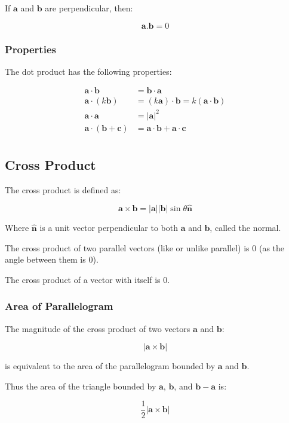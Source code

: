 \documentclass[a4paper,11pt]{article}
\newcommand{\bb}{\boldsymbol}
\begin{document}
If $\bb{a}$ and $\bb{b}$ are perpendicular, then:

$$
\bb{a} . \bb{b} = 0
$$


\subsubsection{Properties}

The dot product has the following properties:

$$
\begin{aligned}
	\bb{a} \cdot \bb{b} & = \bb{b} \cdot \bb{a} \\
	\bb{a} \cdot (k \bb{b}) & = (k \bb{a}) \cdot \bb{b} = k (\bb{a} \cdot \bb{b}) \\
	\bb{a} \cdot \bb{a} & = \lvert \bb{a} \rvert^2 \\
	\bb{a} \cdot (\bb{b} + \bb{c}) & = \bb{a} \cdot \bb{b} + \bb{a} \cdot \bb{c} \\
\end{aligned}
$$


\subsection{Cross Product}

The cross product is defined as:

$$
\bb{a} \times \bb{b} = \lvert \bb{a} \rvert \lvert \bb{b} \rvert \sin{\theta} \hat{\bb{n}}
$$

Where $\hat{\bb{n}}$ is a unit vector perpendicular to both $\bb{a}$ and
$\bb{b}$, called the normal.

The cross product of two parallel vectors (like or unlike parallel) is 0 (as
the angle between them is 0).

The cross product of a vector with itself is 0.


\subsubsection{Area of Parallelogram}

The magnitude of the cross product of two vectors $\bb{a}$ and $\bb{b}$:

$$
\lvert \bb{a} \times \bb{b} \rvert
$$

is equivalent to the area of the parallelogram bounded by $\bb{a}$ and $\bb{b}$.

Thus the area of the triangle bounded by $\bb{a}$, $\bb{b}$, and
$\bb{b} - \bb{a}$ is:

$$
\frac{1}{2} \lvert \bb{a} \times \bb{b} \rvert
$$
\end{document}
